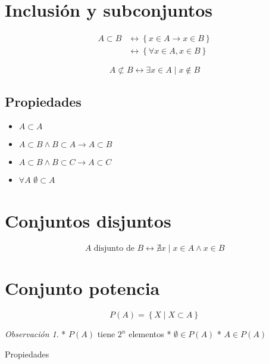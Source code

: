\documentclass[16pt,]{krantz}
\providecommand{\tightlist}{%
  \setlength{\itemsep}{0pt}\setlength{\parskip}{0pt}}
\theoremstyle{definition}
\theoremstyle{definition}
\theoremstyle{definition}
\theoremstyle{definition}
\theoremstyle{remark}
\newtheorem*{remark}{Observación}
\begin{document}
\hypertarget{inclusiuxf3n-y-subconjuntos}{%
\section{Inclusión y subconjuntos}\label{inclusiuxf3n-y-subconjuntos}}

\[
\begin{aligned}
A\subset B&\leftrightarrow\left\{x\in A\rightarrow x\in B\right\}\\
&\leftrightarrow\left\{\forall x\in A, x\in B\right\}
\end{aligned}
\]

\[
A\not\subset B\leftrightarrow\exists x\in A\;|\; x\notin B
\]

\hypertarget{propiedades-1}{%
\subsection{Propiedades}\label{propiedades-1}}

\begin{itemize}
\tightlist
\item
  \(A\subset A\)
\item
  \(A\subset B\wedge B\subset A\rightarrow A\subset B\)
\item
  \(A\subset B\wedge B\subset C\rightarrow A\subset C\)
\item
  \(\forall A\) \(\emptyset\subset A\)
\end{itemize}

\hypertarget{conjuntos-disjuntos}{%
\section{Conjuntos disjuntos}\label{conjuntos-disjuntos}}

\[
A\text{ disjunto de } B\leftrightarrow\nexists x\;|\; x\in A\wedge x\in B  
\]

\hypertarget{conjunto-potencia}{%
\section{Conjunto potencia}\label{conjunto-potencia}}

\[
P(A)=\left\{X\;|\;X\subset A\right\}
\]

\begin{remark}
\iffalse{} {Observación. } \fi{}
* \(P(A)\) tiene \(2^n\) elementos
* \(\emptyset\in P(A)\)
* \(A\in P(A)\)
\end{remark}

Propiedades
\end{document}
